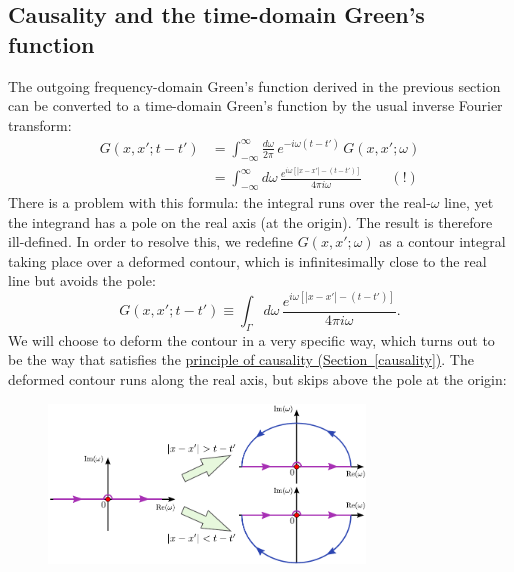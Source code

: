 \documentclass[10pt,a4paper]{article}
\begin{document}
\subsection{Causality and the time-domain Green's function}
\label{causality-and-the-time-domain-greens-function}

The outgoing frequency-domain Green's function derived in the previous
section can be converted to a time-domain Green's function by the
usual inverse Fourier transform:
\begin{align}
  G(x,x';t-t') &= \int_{-\infty}^\infty \frac{d\omega}{2\pi}
  \, e^{-i\omega (t-t')} \, G(x,x'; \omega) \\
  &= \int_{-\infty}^\infty d\omega \,
  \frac{e^{i\omega \left[|x-x'| - (t-t')\right]}}{4\pi i\omega}\qquad (!)
\end{align}
There is a problem with this formula: the integral runs over the
real-$\omega$ line, yet the integrand has a pole on the real axis (at
the origin). The result is therefore ill-defined. In order to resolve
this, we redefine $G(x,x';\omega)$ as a contour integral taking place
over a deformed contour, which is infinitesimally close to the real
line but avoids the pole:
\begin{equation}
  G(x,x';t-t') \equiv \int_\Gamma d\omega \,
  \frac{e^{i\omega \left[|x-x'| - (t-t')\right]}}{4\pi i\omega}.
\end{equation}
We will choose to deform the contour in a very specific way, which
turns out to be the way that satisfies the
\hyperref[causality]{principle of causality
  (Section~\ref{causality})}. The deformed contour runs along the real
axis, but skips above the pole at the origin:

\begin{figure}[h]
  \centering\includegraphics[width=0.75\textwidth]{causality_contour}
\end{figure}
\end{document}

